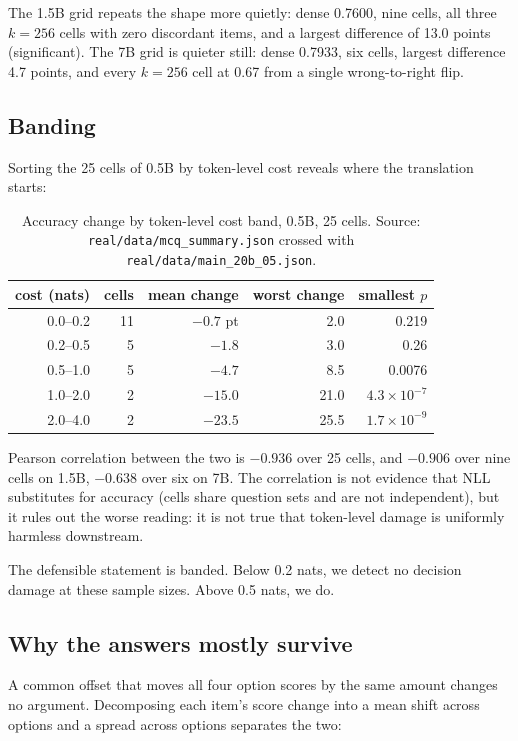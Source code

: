 \documentclass[10pt]{article}
\begin{document}
The 1.5B grid repeats the shape more quietly: dense 0.7600, nine cells, all
three $k{=}256$ cells with zero discordant items, and a largest difference of
13.0 points (significant). The 7B grid is quieter still: dense 0.7933, six
cells, largest difference 4.7 points, and every $k{=}256$ cell at 0.67 from a
single wrong-to-right flip.

\subsection{Banding}

Sorting the 25 cells of 0.5B by token-level cost reveals where the translation
starts:

\begin{table}[h]
\centering
\caption{Accuracy change by token-level cost band, 0.5B, 25 cells. Source:
\texttt{real/data/mcq\_summary.json} crossed with
\texttt{real/data/main\_20b\_05.json}.}
\label{tab:band}
\begin{tabular}{rrrrr}
\toprule
cost (nats) & cells & mean change & worst change & smallest $p$ \\
\midrule
0.0--0.2  & 11 & $-0.7$ pt & 2.0 & 0.219 \\
0.2--0.5  &  5 & $-1.8$ & 3.0 & 0.26 \\
0.5--1.0  &  5 & $-4.7$ & 8.5 & 0.0076 \\
1.0--2.0  &  2 & $-15.0$ & 21.0 & $4.3\times10^{-7}$ \\
2.0--4.0  &  2 & $-23.5$ & 25.5 & $1.7\times10^{-9}$ \\
\bottomrule
\end{tabular}
\end{table}

Pearson correlation between the two is $-0.936$ over 25 cells, and $-0.906$
over nine cells on 1.5B, $-0.638$ over six on 7B. The correlation is not
evidence that NLL substitutes for accuracy (cells share question sets and
are not independent), but it rules out the worse reading: it is not true
that token-level damage is uniformly harmless downstream.

The defensible statement is banded. Below 0.2 nats, we detect no decision
damage at these sample sizes. Above 0.5 nats, we do.

\subsection{Why the answers mostly survive}

A common offset that moves all four option scores by the same amount changes
no argument. Decomposing each item's score change into a mean shift across
options and a spread across options separates the two:
\end{document}
